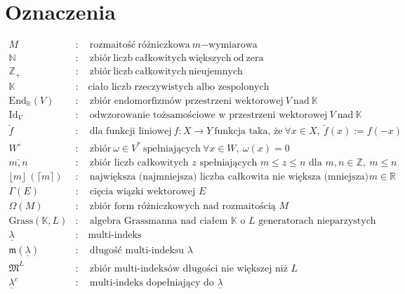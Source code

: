 \documentclass[11pt,a4paper]{report}
\theoremstyle{definition}
\begin{document}
\newpage
\chapter*{Oznaczenia}

\begin{equation*}
\begin{aligned}
M&:\quad \mathrm{rozmaitość\ różniczkowa\ }m\mathrm{-wymiarowa} \\
\mathbb{N}&:\quad \mathrm{zbiór\ liczb\ całkowitych\ większych\ od\ zera}\\
\mathbb{Z}_+\!&:\quad \mathrm{zbiór\ liczb\ całkowitych\ nieujemnych} \\
\mathbb{K}&:\quad \textrm{ciało liczb rzeczywistych albo zespolonych} \\
\textrm{End}_{\mathbb{K}}(V)&:\quad \textrm{zbiór endomorfizmów przestrzeni wektorowej}\ V\ \textrm{nad}\ \mathbb{K} \\
\textrm{Id}_V&:\quad \textrm{odwzorowanie tożsamościowe w przestrzeni wektorowej}\ V\ \textrm{nad}\ \mathbb{K} \\
\check{f}&:\quad \textrm{dla funkcji liniowej}\ f: X \rightarrow Y\ \textrm{funkcja taka, że}\ \forall x \in X,\ \check{f}(x) := f(-x)\\
W^{\circ}&:\quad \textrm{zbiór}\ \omega \in V^*\ \textrm{spełniających}\ \forall x \in W,\ \omega (x) = 0\\
\overline{m,n}&: \quad \textrm{zbiór liczb całkowitych\ } z \textrm{\ spełniających }  m \leq z \leq n \textrm{\ dla } m,n \in \mathbb{Z},\ m \leq n\\
\lfloor m \rfloor\ (\lceil m \rceil)&: \quad \textrm{największa (najmniejsza) liczba całkowita nie większa (mniejsza) niż\ } m \in \mathbb{R} \\
\Gamma(E)&: \quad \textrm{cięcia wiązki wektorowej }E \\
\Omega(M)&: \quad \textrm{zbiór form różniczkowych nad rozmaitością }M\\
\mathrm{Grass}(\mathbb{K}, L)&: \quad \textrm{algebra Grassmanna nad ciałem } \mathbb{K} \textrm{ o } L \textrm{ generatorach nieparzystych} \\
\underline \lambda&: \quad \textrm{multi-indeks} \\
\mathfrak{m}(\underline \lambda)&: \quad \textrm{długość multi-indeksu } \lambda \\
\mathfrak{M}^L&: \quad \textrm{zbiór multi-indeksów długości nie większej niż }L \\
\underline \lambda ^c&: \quad \textrm{multi-indeks dopełniający do }\underline \lambda \\

\end{aligned}
\end{equation*}
\end{document}
